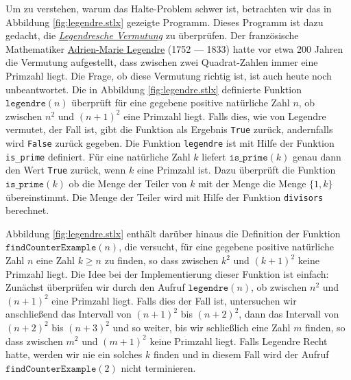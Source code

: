 Um zu verstehen, warum das Halte-Problem schwer ist, betrachten wir  
das in Abbildung \ref{fig:legendre.stlx} gezeigte Programm. 
Dieses Programm ist dazu gedacht, die
\href{http://de.wikipedia.org/wiki/Legendresche_Vermutung}{\emph{Legendresche Vermutung}} zu
überprüfen.  Der französische 
Mathematiker  \href{http://de.wikipedia.org/wiki/Adrien-Marie_Legendre}{Adrien-Marie Legendre} 
(1752 --- 1833) hatte vor etwa 200 Jahren die Vermutung 
aufgestellt, dass zwischen zwei Quadrat-Zahlen immer eine Primzahl liegt.  Die Frage, ob diese
Vermutung richtig ist, ist auch heute noch unbeantwortet.  Die in Abbildung \ref{fig:legendre.stlx}
definierte Funktion $\texttt{legendre}(n)$ überprüft für eine gegebene positive natürliche Zahl $n$,
ob zwischen $n^2$ und $(n+1)^2$ eine Primzahl liegt.  Falls dies, wie von Legendre vermutet, der
Fall ist, gibt die Funktion als Ergebnis \texttt{True} zurück, andernfalls wird \texttt{False}
zurück gegeben.  Die Funktion \texttt{legendre} ist mit Hilfe der Funktion \texttt{is\_prime} definiert.  Für
eine natürliche Zahl $k$ liefert $\mathtt{is\_prime}(k)$ genau dann den Wert \texttt{True} zurück, wenn $k$
eine Primzahl ist.  Dazu überprüft die Funktion $\mathtt{is\_prime}(k)$ ob die Menge der Teiler von $k$ mit der Menge
die Menge $\{1, k\}$ übereinstimmt.  Die Menge der Teiler wird mit Hilfe der Funktion \texttt{divisors} berechnet.

Abbildung \ref{fig:legendre.stlx} enthält darüber hinaus die Definition der Funktion
$\texttt{findCounterExample}(n)$, die versucht, für eine gegebene positive natürliche Zahl $n$ eine
Zahl $k \geq n$ zu finden, so dass zwischen $k^2$ und $(k+1)^2$ keine Primzahl liegt.  Die Idee bei
der Implementierung dieser Funktion ist einfach:  Zunächst überprüfen wir durch den Aufruf
$\texttt{legendre}(n)$, ob zwischen $n^2$ und $(n+1)^2$
eine Primzahl liegt.  Falls dies der Fall ist, untersuchen wir anschließend das Intervall von
$(n+1)^2$ bis $(n+2)^2$, dann das Intervall von 
$(n+2)^2$ bis $(n+3)^2$ und so weiter, bis wir schließlich eine Zahl $m$ finden, so dass zwischen
$m^2$ und $(m+1)^2$ keine Primzahl liegt.  Falls Legendre Recht hatte, werden wir nie ein solches
$k$ finden und in diesem Fall wird der Aufruf $\texttt{findCounterExample}(2)$ nicht terminieren. 

